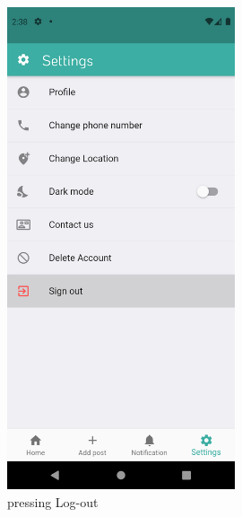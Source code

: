 \documentclass[12pt]{article}
\begin{document}
  \begin{figure}[h!]
\centerline{\includegraphics[width=0.6\textwidth]{./Screenshots/18.PNG}}
  \caption{pressing Log-out}
  \end{figure}  
\end{document}
